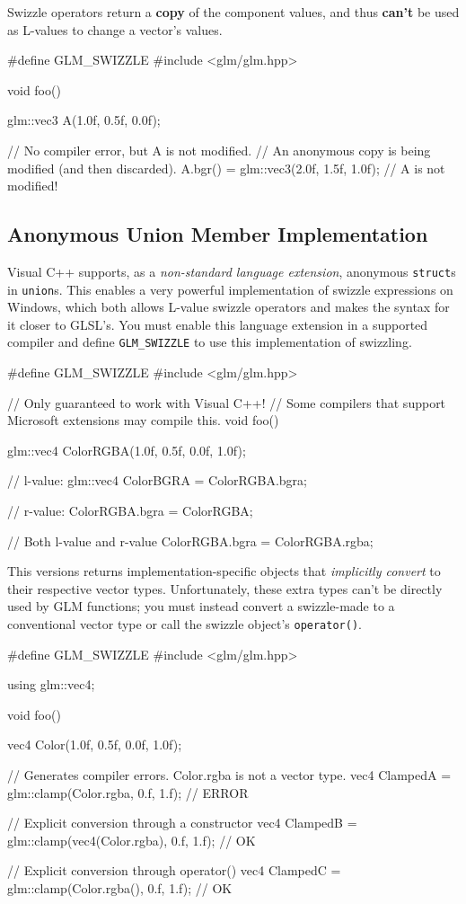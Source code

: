 \documentclass{scrartcl}
\numberwithin{figure}{subsection}
\begin{document}
Swizzle operators return a \textbf{copy} of the component values, and thus \textbf{can't} be used as L-values to change a vector's values.

\begin{cppcode}
#define GLM_SWIZZLE 
#include <glm/glm.hpp>

void foo()
{
  glm::vec3 A(1.0f, 0.5f, 0.0f);

  // No compiler error, but A is not modified.
  // An anonymous copy is being modified (and then discarded).
  A.bgr() = glm::vec3(2.0f, 1.5f, 1.0f); // A is not modified!
}
\end{cppcode}


\subsection{Anonymous Union Member Implementation}

Visual C++ supports, as a \emph{non-standard language extension}, anonymous \verb|struct|s in \verb|union|s. This enables a very powerful implementation of swizzle expressions on Windows, which both allows L-value swizzle operators and makes the syntax for it closer to GLSL's.  You must enable this language extension in a supported compiler and define \verb|GLM_SWIZZLE| to use this implementation of swizzling.

\begin{cppcode}
#define GLM_SWIZZLE 
#include <glm/glm.hpp>

// Only guaranteed to work with Visual C++!
// Some compilers that support Microsoft extensions may compile this.
void foo()
{
  glm::vec4 ColorRGBA(1.0f, 0.5f, 0.0f, 1.0f);

  // l-value:
  glm::vec4 ColorBGRA = ColorRGBA.bgra;

  // r-value:
  ColorRGBA.bgra = ColorRGBA;

  // Both l-value and r-value
  ColorRGBA.bgra = ColorRGBA.rgba;
}
\end{cppcode}

This versions returns implementation-specific objects that \emph{implicitly convert} to their respective vector types.  Unfortunately, these extra types can't be directly used by GLM functions; you must instead convert a swizzle-made  to a conventional vector type or call the swizzle object's \verb|operator()|.

\begin{cppcode}
#define GLM_SWIZZLE 
#include <glm/glm.hpp>

using glm::vec4;

void foo()
{
  vec4 Color(1.0f, 0.5f, 0.0f, 1.0f);

  // Generates compiler errors. Color.rgba is not a vector type.
  vec4 ClampedA = glm::clamp(Color.rgba, 0.f, 1.f); // ERROR 

  // Explicit conversion through a constructor
  vec4 ClampedB = glm::clamp(vec4(Color.rgba), 0.f, 1.f); // OK

  // Explicit conversion through operator()
  vec4 ClampedC = glm::clamp(Color.rgba(), 0.f, 1.f); // OK
}
\end{cppcode}
\end{document}
